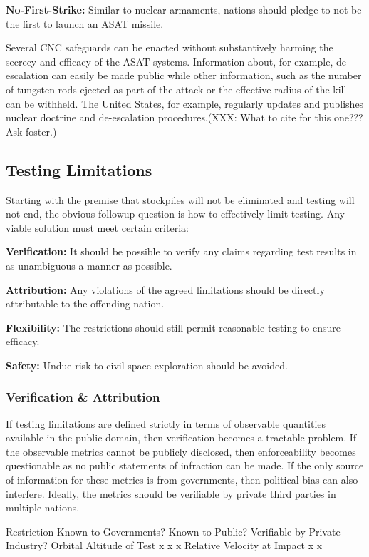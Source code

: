 \textbf{No-First-Strike:} Similar to nuclear armaments, nations should
pledge to not be the first to launch an ASAT missile.

Several CNC safeguards can be enacted without substantively harming
the secrecy and efficacy of the ASAT systems.  Information about, for
example, de-escalation can easily be made public while other
information, such as the number of tungsten rods ejected as part of
the attack or the effective radius of the kill can be withheld.  The
United States, for example, regularly updates and publishes nuclear
doctrine and de-escalation procedures.(XXX: What to cite for this
one??? Ask foster.)

\subsection{Testing Limitations}
Starting with the premise that stockpiles will not be eliminated and
testing will not end, the obvious followup question is how to
effectively limit testing.  Any viable solution must meet certain
criteria:

\textbf{Verification:} It should be possible to verify any claims
regarding test results in as unambiguous a manner as possible.

\textbf{Attribution:} Any violations of the agreed limitations should
be directly attributable to the offending nation.

\textbf{Flexibility:} The restrictions should still permit reasonable
testing to ensure efficacy.

\textbf{Safety:} Undue risk to civil space exploration should be
avoided.

\subsubsection{Verification \& Attribution}
If testing limitations are defined strictly in terms of observable
quantities available in the public domain, then verification becomes a
tractable problem.  If the observable metrics cannot be publicly
disclosed, then enforceability becomes questionable as no public
statements of infraction can be made.  If the only source of
information for these metrics is from governments, then political bias
can also interfere.  Ideally, the metrics should be verifiable by
private third parties in multiple nations.


Restriction
Known to Governments?
Known to Public?
Verifiable by Private Industry?
Orbital Altitude of Test
x
x
x
Relative Velocity at Impact
x
x


